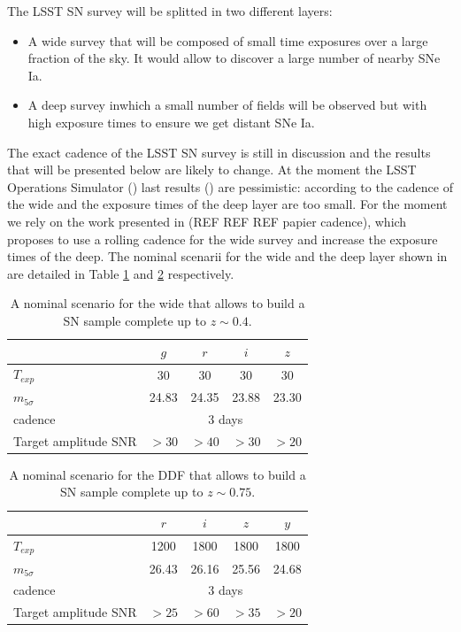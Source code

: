 \documentclass[\docopts]{\docclass}
\begin{document}
The LSST SN survey will be splitted in two different layers:
\begin{itemize}
\item A wide survey that will be composed of small time exposures over a large fraction of the sky.
  It would allow to discover a large number of nearby SNe Ia.
\item A deep survey inwhich a small number of fields will be observed but with high exposure times to ensure we get distant SNe Ia.
\end{itemize}
The exact cadence of the LSST SN survey is still in discussion and the results that will be presented below are likely to change.
At the moment the LSST Operations Simulator () last results () are pessimistic: according to \cite{SN-CADENCE} the cadence of the wide and the exposure times of the deep layer are too small.
For the moment we rely on the work presented in (REF REF REF papier cadence), which proposes to use a rolling cadence for the wide survey and increase the exposure times of the deep. The nominal scenarii for the wide and the deep layer shown in \cite{SN-CADENCE} are detailed in Table \ref{tab:nominal_scenario_wide} and \ref{tab:nominal_scenario_DDF} respectively.

\begin{table}[t]
\begin{center}
\caption{A nominal scenario for the wide that allows to build a SN
  sample complete up to $z \sim 0.4$.}
\label{tab:nominal_scenario_wide}
\begin{tabular}{l|cccc}
\hline
\hline
              & $g$ & $r$ & $i$ & $z$ \\
\hline 
$T_{exp}$      & 30       &   30    &  30        & 30       \\
$m_{5\sigma}$  &  24.83   &  24.35   &  23.88    &  23.30   \\
cadence       &  \multicolumn{4}{c}{3 days} \\
Target amplitude SNR & $>30$ & $>40$ & $>30$ & $>20$ \\
\hline
\end{tabular}
\end{center}
\end{table}

\begin{table}[t]
\begin{center}
\caption{A nominal scenario for the DDF that allows to build a SN
  sample complete up to $z \sim 0.75$.}
\label{tab:nominal_scenario_DDF}
\begin{tabular}{l|cccc}
\hline
\hline
              & $r$ & $i$ & $z$ & $y$ \\
\hline 
$T_{exp}$      & 1200 & 1800 & 1800 & 1800 \\
$m_{5\sigma}$  & 26.43    & 26.16    &  25.56    &  24.68   \\
cadence       &  \multicolumn{4}{c}{3 days} \\
Target amplitude SNR & $>25$ & $>60$ & $>35$ & $>20$ \\
\hline
\end{tabular}
\end{center}
\end{table}
\end{document}
